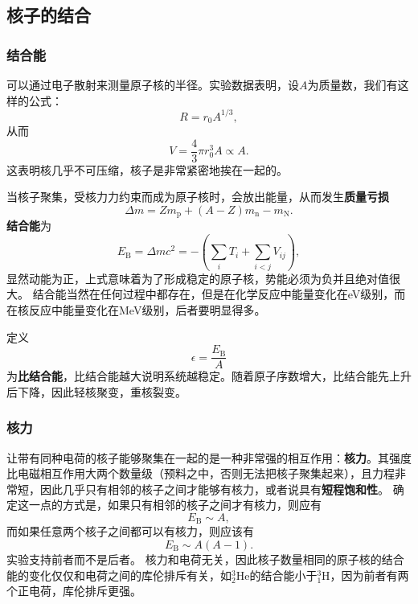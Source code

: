 \documentclass[UTF8, a4paper]{ctexart}
\newcommand*{\nuclear}[3]{^{#2}_{#3}\text{#1}}
\begin{document}
\subsection{核子的结合}

\subsubsection{结合能}

可以通过电子散射来测量原子核的半径。实验数据表明，设$A$为质量数，我们有这样的公式：
\begin{equation}
    R = r_0 A^{1/3},
\end{equation}
从而
\[
    V = \frac{4}{3} \pi r_0^3 A \propto A.
\]
这表明核几乎不可压缩，核子是非常紧密地挨在一起的。

当核子聚集，受核力力约束而成为原子核时，会放出能量，从而发生\textbf{质量亏损}
\begin{equation}
    \Delta m = Z m_\text{p} + (A - Z) m_\text{n} - m_\text{N}.
\end{equation}
\textbf{结合能}为
\begin{equation}
    E_\text{B} = \Delta m c^2 = - \left( \sum_i T_i + \sum_{i < j} V_{ij} \right), 
\end{equation}
显然动能为正，上式意味着为了形成稳定的原子核，势能必须为负并且绝对值很大。
结合能当然在任何过程中都存在，但是在化学反应中能量变化在eV级别，而在核反应中能量变化在MeV级别，后者要明显得多。

定义
\begin{equation}
    \epsilon = \frac{E_\text{B}}{A} 
\end{equation}
为\textbf{比结合能}，比结合能越大说明系统越稳定。随着原子序数增大，比结合能先上升后下降，因此轻核聚变，重核裂变。

\subsubsection{核力}

让带有同种电荷的核子能够聚集在一起的是一种非常强的相互作用：\textbf{核力}。其强度比电磁相互作用大两个数量级（预料之中，否则无法把核子聚集起来），且力程非常短，因此几乎只有相邻的核子之间才能够有核力，或者说具有\textbf{短程饱和性}。
确定这一点的方式是，如果只有相邻的核子之间才有核力，则应有
\[
    E_\text{B} \sim A,
\]
而如果任意两个核子之间都可以有核力，则应该有
\[
    E_\text{B} \sim A(A-1).
\]
实验支持前者而不是后者。
核力和电荷无关，因此核子数量相同的原子核的结合能的变化仅仅和电荷之间的库伦排斥有关，如$\nuclear{He}{3}{2}$的结合能小于$\nuclear{H}{3}{1}$，因为前者有两个正电荷，库伦排斥更强。
\end{document}
